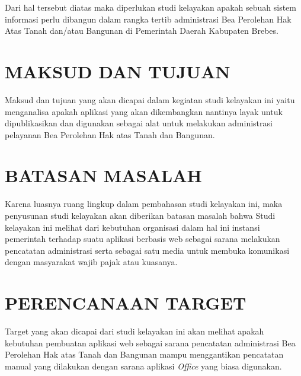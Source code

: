\documentclass[pdftex,12pt, oneside]{article}
\begin{document}
Dari hal tersebut diatas maka diperlukan studi kelayakan apakah sebuah sistem informasi perlu dibangun dalam rangka tertib administrasi Bea Perolehan Hak Atas Tanah dan/atau Bangunan di Pemerintah Daerah Kabupaten Brebes.  

\section{MAKSUD DAN TUJUAN}

Maksud dan tujuan yang akan dicapai dalam kegiatan studi kelayakan ini yaitu menganalisa apakah aplikasi yang akan dikembangkan nantinya layak untuk dipublikasikan dan digunakan sebagai alat untuk melakukan administrasi pelayanan Bea Perolehan Hak atas Tanah dan Bangunan.

\section{BATASAN MASALAH}

Karena luasnya ruang lingkup dalam pembahasan studi kelayakan ini, maka penyusunan studi kelayakan akan diberikan batasan masalah bahwa Studi kelayakan ini melihat dari kebutuhan organisasi dalam hal ini instansi pemerintah terhadap suatu aplikasi berbasis web sebagai sarana melakukan pencatatan administrasi serta sebagai satu media untuk membuka komunikasi dengan masyarakat wajib pajak atau kuasanya.

\section{PERENCANAAN TARGET}

Target yang akan dicapai dari studi kelayakan ini akan melihat apakah kebutuhan pembuatan aplikasi web sebagai sarana pencatatan administrasi Bea Perolehan Hak atas Tanah dan Bangunan mampu menggantikan pencatatan manual yang dilakukan dengan sarana aplikasi \textit{Office} yang biasa digunakan.
\end{document}
